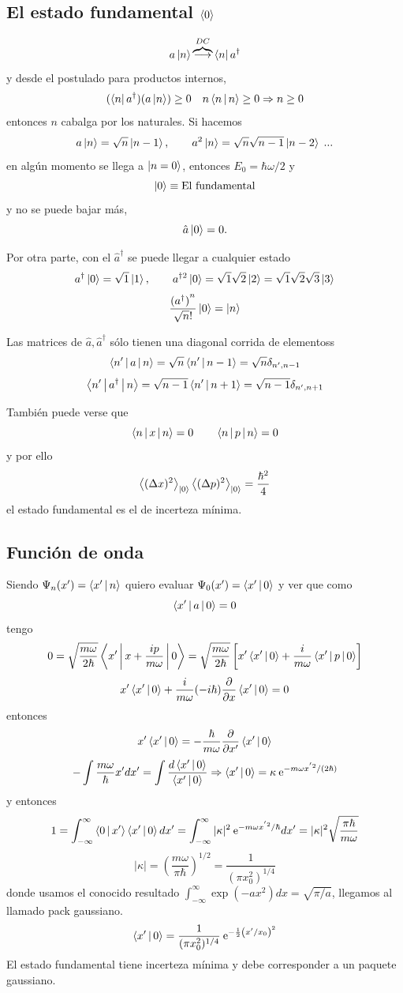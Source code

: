 \documentclass[10pt,oneside]{CBFT_book}
\begin{document}
\subsection{El estado fundamental $\Braket{0}$}

\[
	a \Ket{n}  \overbrace{\longrightarrow}^{DC} \Bra{n} a^\dagger
\]
y desde el postulado para productos internos,
\[
	(\Bra{n}a^\dagger)(a\Ket{n}) \geq 0 \quad n \Braket{n|n} \geq 0 \Rightarrow n \geq 0 
\]
entonces $n$ cabalga por los naturales.
Si hacemos 
\[
	a\Ket{n} = \sqrt{n} \Ket{n-1}, \qquad  a^2 \Ket{n} = \sqrt{n}\sqrt{n-1} \Ket{n-2} \; ...
\]
en algún momento se llega a $\Ket{n=0}$, entonces $E_0 = \hbar\omega/2$ y 
\[
	\Ket{0} \equiv \text{El fundamental}
\]
y no se puede bajar más,
\[
	\hat{a}\Ket{0} = 0.
\]

Por otra parte, con el $\hat{a}^\dagger$ se puede llegar a cualquier estado
\[
	a^\dagger \Ket{0} = \sqrt{1} \Ket{1}, \qquad  a^{\dagger 2} \Ket{0} = \sqrt{1}\sqrt{2} \Ket{2} = 
	\sqrt{1}\sqrt{2}\sqrt{3} \Ket{3}
\]
\[
	\frac{{(a^{\dagger})}^n}{\sqrt{n}!} \Ket{0} = \Ket{n}
\]

Las matrices de $\hat{a},\hat{a}^\dagger$ sólo tienen una diagonal corrida de elementoss 
\[
	\Braket{n'|a|n} = \sqrt{n} \Braket{n'|n-1} = \sqrt{n} \delta_{n',n-1}
\]
\[
	\Braket{n'|a^\dagger|n} =  \sqrt{n-1} \Braket{n'|n+1} = \sqrt{n-1} \delta_{n',n+1}
\]

También puede verse que 
\[
	\Braket{n|x|n}= 0 \qquad \Braket{n|p|n}= 0
\]
y por ello 
\[
	\Braket{(\Delta x)^2}_{\Ket{0}} \Braket{(\Delta p)^2}_{\Ket{0}} = \frac{\hbar^2}{4} 
\]
el estado fundamental es el de incerteza mínima.

\subsection{Función de onda}

Siendo $\Psi_n(x') = \Braket{x'|n}$ quiero evaluar $\Psi_0(x') = \Braket{x'|0}$ y ver que como 
\[
	\Braket{x'|a|0}= 0 
\]
tengo 
\[
	0 = \sqrt{ \frac{m\omega}{2\hbar} } \Braket{x'|x+\frac{ip}{m\omega}|0} =
	\sqrt{ \frac{m\omega}{2\hbar} } \left[ x'\Braket{x'|0} + \frac{i}{m\omega}\Braket{x'|p|0} \right]
\]
\[
	x' \Braket{x'|0} + \frac{i}{m\omega} (-i\hbar) \frac{\partial^{\hspace{-0.05em}} {}}{\partial {x}^{\hspace{-0.05em}}} \Braket{x'|0} = 0
\]
entonces 
\[
	x' \Braket{x'|0} = - \frac{\hbar}{m\omega} \frac{\partial^{\hspace{-0.05em}} {}}{\partial {x'}^{\hspace{-0.05em}}}\Braket{x'|0} 
\]
\[
	- \int \frac{m\omega}{\hbar} x' dx' = \int \frac{d \Braket{x'|0}}{\Braket{x'|0}} \Rightarrow 
	\Braket{x'|0} = \kappa \:\mathrm{e}^{-m\omega x^{'2}/(2\hbar)}
\]
y entonces 
\[
	1 = \int_{-\infty}^{\infty} \Braket{0|x'}\Braket{x'|0} dx' = 
	\int_{-\infty}^{\infty} |\kappa|^2 \:\mathrm{e}^{-m\omega x^{'2}/\hbar} dx' =
	|\kappa|^2 \sqrt{\frac{\pi\hbar}{m\omega}} 
\]
\[
	|\kappa| = \left( \frac{m\omega}{\pi\hbar} \right)^{1/2} = \frac{1}{(\pi x_0^2)^{1/4}}
\]
donde usamos el conocido resultado $\int_{-\infty}^\infty \exp( - a x^2) dx = \sqrt{\pi/a}$, llegamos al 
llamado pack 
gaussiano.
\[
	\Braket{x'|0} = \frac{1}{(\pi x_0^2)^{1/4}} \:\mathrm{e}^{-\frac{1}{2}\left( x'/x_0 \right)^2}
\]
El estado fundamental tiene incerteza mínima y debe corresponder a un paquete gaussiano.
\end{document}
